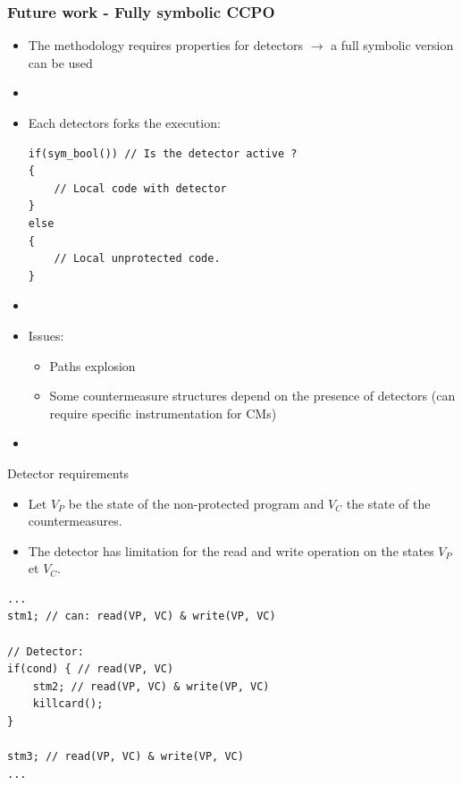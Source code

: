 \begin{frame} \frametitle{Future work - Fully symbolic CCPO} 
    \begin{itemize}
        \item The methodology requires properties for detectors $\rightarrow$ a full symbolic version can be used
        \item[]
        \item Each detectors forks the execution:
        \lstset{style=customc}
        \begin{lstlisting}
if(sym_bool()) // Is the detector active ?
{
    // Local code with detector
}
else
{
    // Local unprotected code.
}
        \end{lstlisting}
        \item[]
        \item Issues:
        \begin{itemize}
            \item Paths explosion
            \item Some countermeasure structures depend on the presence of detectors (can require specific instrumentation for CMs)
        \end{itemize}
        \item[]
    \end{itemize}
\vfill
\end{frame}

\begin{frame}{Detector requirements} 
    \begin{itemize}
       \item[] Let $V_P$ be the state of the non-protected program and $V_C$ the state of the countermeasures.
       \item[] The detector has limitation for the read and write operation on the states $V_P$ et $V_C$.
    \end{itemize}
    
    \lstset{style=customc}
    \begin{lstlisting}
...
stm1; // can: read(VP, VC) & write(VP, VC)

// Detector:
if(cond) { // read(VP, VC)
    stm2; // read(VP, VC) & write(VP, VC)
    killcard(); 
} 

stm3; // read(VP, VC) & write(VP, VC)
...
    \end{lstlisting}
\end{frame}

